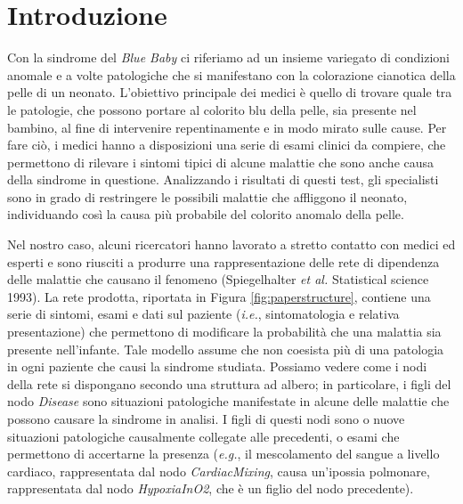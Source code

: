 \chapter{Introduzione}
Con la sindrome del \textit{Blue Baby} ci riferiamo ad un insieme variegato di condizioni anomale e a volte patologiche che si manifestano con la colorazione cianotica della pelle di un neonato.
L'obiettivo principale dei medici è quello di trovare quale tra le patologie, che possono portare al colorito blu della pelle, sia presente nel bambino, al fine di intervenire repentinamente e in modo mirato sulle cause. Per fare ciò, i medici hanno a disposizioni una serie di esami clinici da compiere, che permettono di rilevare i sintomi tipici di alcune malattie che sono anche causa della sindrome in questione. Analizzando i risultati di questi test, gli specialisti sono in grado di restringere le possibili malattie che affliggono il neonato, individuando così la causa più probabile del colorito anomalo della pelle.

Nel nostro caso, alcuni ricercatori hanno lavorato a stretto contatto con medici ed esperti e sono riusciti a produrre una rappresentazione delle rete di dipendenza delle malattie che causano il fenomeno (Spiegelhalter \textit{et al.} Statistical science 1993). La rete prodotta, riportata in Figura \ref{fig:paperstructure}, contiene una serie di sintomi, esami e dati sul paziente (\textit{i.e.}, sintomatologia e relativa presentazione) che permettono di modificare la probabilità che una malattia sia presente nell'infante. Tale modello assume che non coesista più di una patologia in ogni paziente che causi la sindrome studiata. Possiamo vedere come i nodi della rete si dispongano secondo una struttura ad albero; in particolare, i figli del nodo \textit{Disease} sono situazioni patologiche manifestate in alcune delle malattie che possono causare la sindrome in analisi. I figli di questi nodi sono o nuove situazioni patologiche causalmente collegate alle precedenti, o esami che permettono di accertarne la presenza (\textit{e.g.}, il mescolamento del sangue a livello cardiaco, rappresentata dal nodo \textit{CardiacMixing}, causa un'ipossia polmonare, rappresentata dal nodo \textit{HypoxiaInO2}, che è un figlio del nodo precedente).
 
